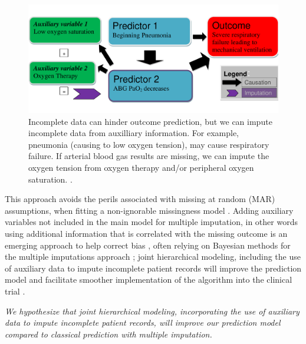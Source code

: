 \documentclass[11pt,notitlepage]{article}
\begin{document}
\begin{figure} 
 \vspace{-10pt}
 \includegraphics[scale=0.4]{Figures/Bayesian_imputation.pdf}
    \vspace{-20pt}
  \caption{\footnotesize Incomplete data can hinder outcome prediction, but we can impute incomplete data from auxilliary information. For example, pneumonia (causing to low oxygen tension), may cause respiratory failure. If arterial blood gas results are missing, we can impute the oxygen tension from oxygen therapy and/or peripheral oxygen saturation.  \cite{Hall_25389642}.}
   \vspace{-5pt}
    \label{fig:Imputation_fig}
\end{figure}

This approach avoids the perils associated with missing at random (MAR) assumptions, when fitting a non-ignorable missingness model \cite{Wang_20029935}. Adding auxiliary variables not included in the main model for multiple imputation, in other words using additional information that is correlated with the missing outcome is an emerging approach to help correct bias \cite{Meng_1994, Collins_11778676, Rubin_1996}, often relying on Bayesian methods for the multiple imputations approach \cite{Daniels_2008, Schafer_1997}; joint hierarchical modeling, including the use of auxiliary data to impute incomplete patient records will improve the prediction model and facilitate smoother implementation of the algorithm into the clinical trial \cite{Hall_25389642}.

\vspace{5pt}
\emph{We hypothesize that joint hierarchical modeling, incorporating the use of auxiliary data to impute incomplete patient records, will improve our prediction model compared to classical prediction with multiple imputation.}
\end{document}
